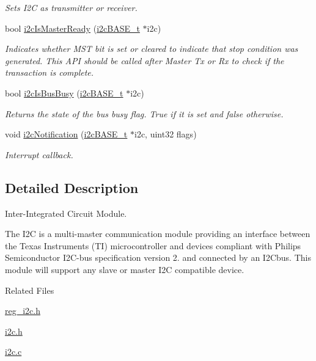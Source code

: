 \begin{DoxyCompactItemize}
\begin{DoxyCompactList}\small\item\em Sets I2C as transmitter or receiver. \end{DoxyCompactList}\item 
bool \mbox{\hyperlink{group__I2C_ga09ef340f59e7eb274327077b26d77572}{i2c\+Is\+Master\+Ready}} (\mbox{\hyperlink{reg__i2c_8h_a5d6c119fb20e803a530d0d4df544daf7}{i2c\+B\+A\+S\+E\+\_\+t}} $\ast$i2c)
\begin{DoxyCompactList}\small\item\em Indicates whether M\+ST bit is set or cleared to indicate that stop condition was generated. This A\+PI should be called after Master Tx or Rx to check if the transaction is complete. \end{DoxyCompactList}\item 
bool \mbox{\hyperlink{group__I2C_gad79e4ee925c6880eb644329b6701a292}{i2c\+Is\+Bus\+Busy}} (\mbox{\hyperlink{reg__i2c_8h_a5d6c119fb20e803a530d0d4df544daf7}{i2c\+B\+A\+S\+E\+\_\+t}} $\ast$i2c)
\begin{DoxyCompactList}\small\item\em Returns the state of the bus busy flag. True if it is set and false otherwise. \end{DoxyCompactList}\item 
void \mbox{\hyperlink{group__I2C_ga5ecfeeec39ad8a6788eade4f0c89eb62}{i2c\+Notification}} (\mbox{\hyperlink{reg__i2c_8h_a5d6c119fb20e803a530d0d4df544daf7}{i2c\+B\+A\+S\+E\+\_\+t}} $\ast$i2c, uint32 flags)
\begin{DoxyCompactList}\small\item\em Interrupt callback. \end{DoxyCompactList}\end{DoxyCompactItemize}


\subsection{Detailed Description}
Inter-\/\+Integrated Circuit Module. 

The I2C is a multi-\/master communication module providing an interface between the Texas Instruments (TI) microcontroller and devices compliant with Philips Semiconductor I2\+C-\/bus specification version 2. and connected by an I2\+Cbus. This module will support any slave or master I2C compatible device.

Related Files
\begin{DoxyItemize}
\item \mbox{\hyperlink{reg__i2c_8h}{reg\+\_\+i2c.\+h}}
\item \mbox{\hyperlink{i2c_8h_source}{i2c.\+h}}
\item \mbox{\hyperlink{i2c_8c}{i2c.\+c}} 
\end{DoxyItemize}

